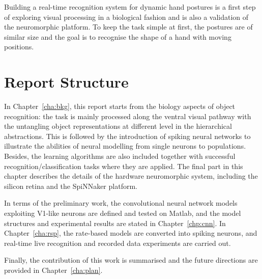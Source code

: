 Building a real-time recognition system for dynamic hand postures is a first step of exploring visual processing in a biological fashion and is also a validation of the neuromorphic platform.
To keep the task simple at first, the postures are of similar size and the goal is to recognise the shape of a hand with moving positions.
\section{Report Structure}
\label{sec:str}
In Chapter~\ref{cha:bkg}, this report starts from the biology aspects of object recognition: the task is mainly processed along the ventral visual pathway with the untangling object representations at different level in the hierarchical abstractions.
This is followed by the introduction of spiking neural networks to illustrate the abilities of neural modelling from single neurons to populations.
Besides, the learning algorithms are also included together with successful recognition/classification tasks where they are applied.
The final part in this chapter describes the details of the hardware neuromorphic system, including the silicon retina and the SpiNNaker platform.

In terms of the preliminary work, the convolutional neural network models exploiting V1-like neurons are defined and tested on Matlab, and the model structures and experimental results are stated in Chapter~\ref{chp:cnn}.
In Chapter~\ref{cha:rsp}, the rate-based models are converted into spiking neurons, and real-time live recognition and recorded data experiments are carried out.

Finally, the contribution of this work is summarised and the future directions are provided in Chapter~\ref{cha:plan}.
